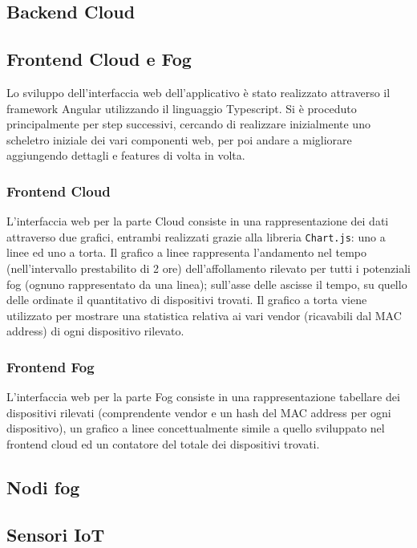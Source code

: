\subsection{Backend Cloud}

\subsection{Frontend Cloud e Fog}

Lo sviluppo dell'interfaccia web dell'applicativo è stato realizzato attraverso il framework Angular utilizzando il linguaggio Typescript. Si è proceduto principalmente per step successivi, cercando di realizzare inizialmente uno scheletro iniziale dei vari componenti web, per poi andare a migliorare aggiungendo dettagli e features di volta in volta.

  \subsubsection{Frontend Cloud}

  L'interfaccia web per la parte Cloud consiste in una rappresentazione dei dati attraverso due grafici, entrambi realizzati grazie alla libreria \texttt{Chart.js}: uno a linee ed uno a torta.
  Il grafico a linee rappresenta l'andamento nel tempo (nell'intervallo prestabilito di 2 ore) dell'affollamento rilevato per tutti i potenziali fog (ognuno rappresentato da una linea); sull'asse delle ascisse il tempo, su quello delle ordinate il quantitativo di dispositivi trovati.
  Il grafico a torta viene utilizzato per mostrare una statistica relativa ai vari vendor (ricavabili dal MAC address) di ogni dispositivo rilevato.

  \subsubsection{Frontend Fog}

  L'interfaccia web per la parte Fog consiste in una rappresentazione tabellare dei dispositivi rilevati (comprendente vendor e un hash del MAC address per ogni dispositivo), un grafico a linee concettualmente simile a quello sviluppato nel frontend cloud ed un contatore del totale dei dispositivi trovati.

\subsection{Nodi fog}

\subsection{Sensori IoT}
